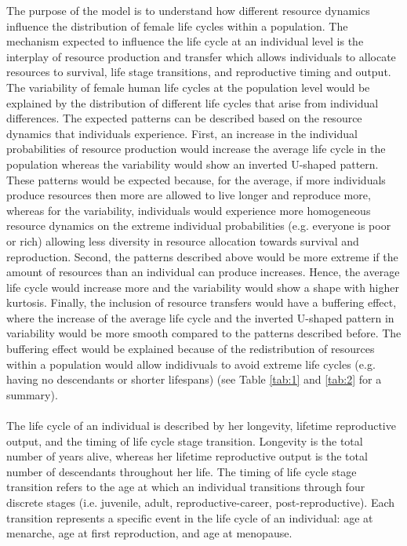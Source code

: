 \documentclass{article}
\begin{document}
The purpose of the model is to understand how different resource dynamics influence the distribution of female life cycles within a population. The mechanism expected to influence the life cycle at an individual level is the interplay of resource production and transfer which allows individuals to allocate resources to survival, life stage transitions, and reproductive timing and output. The variability of female human life cycles at the population level would be explained by the distribution of different life cycles that arise from individual differences. The expected patterns can be described based on the resource dynamics that individuals experience. First, an increase in the individual probabilities of resource production would increase the average life cycle in the population whereas the variability would show an inverted U-shaped pattern. These patterns would be expected because, for the average, if more individuals produce resources then more are allowed to live longer and reproduce more, whereas for the variability, individuals would experience more homogeneous resource dynamics on the extreme individual probabilities (e.g. everyone is poor or rich) allowing less diversity in resource allocation towards survival and reproduction. Second, the patterns described above would be more extreme if the amount of resources than an individual can produce increases. Hence, the average life cycle would increase more and the variability would show a shape with higher kurtosis. Finally, the inclusion of resource transfers would have a buffering effect, where the increase of the average life cycle and the inverted U-shaped pattern in variability would be more smooth compared to the patterns described before. The buffering effect would be explained because of the redistribution of resources within a population would allow indidivuals to avoid extreme life cycles (e.g. having no descendants or shorter lifespans) (see Table \ref{tab:1} and \ref{tab:2} for a summary).
\\\\
The life cycle of an individual is described by her longevity, lifetime reproductive output, and the timing of life cycle stage transition. Longevity is the total number of years alive, whereas her lifetime reproductive output is the total number of descendants throughout her life. The timing of life cycle stage transition refers to the age at which an individual transitions through four discrete stages (i.e. juvenile, adult, reproductive-career, post-reproductive). Each transition represents a specific event in the life cycle of an individual: age at menarche, age at first reproduction, and age at menopause.
\end{document}

